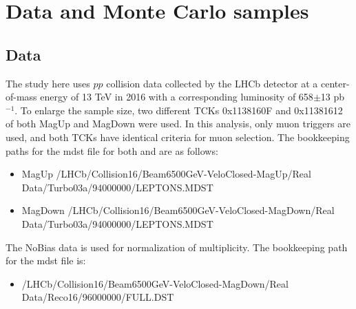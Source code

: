 \section{Data and Monte Carlo samples}
\label{Data and Monte Carlo samples}
\subsection{Data}
The study here uses $pp$ collision data collected by the LHCb detector at a center-of-mass energy of 
13 TeV in 2016 with a corresponding luminosity of 658$\pm$13 pb$^{-1}$. To enlarge the sample size, two different 
TCKs 0x1138160F and 0x11381612 of both MagUp and MagDown were used. In this analysis, only muon triggers are 
used, and both TCKs have identical criteria for muon selection. The bookkeeping paths for the mdst file for both \jpsi and \psitwos are as follows:
\begin{itemize}
    \item MagUp /LHCb/Collision16/Beam6500GeV-VeloClosed-MagUp/Real Data/Turbo03a/94000000/LEPTONS.MDST
    \item MagDown /LHCb/Collision16/Beam6500GeV-VeloClosed-MagDown/Real Data/Turbo03a/94000000/LEPTONS.MDST
\end{itemize}
The NoBias data is used for normalization of multiplicity. The bookkeeping path for the mdst file is:
\begin{itemize}
    \item /LHCb/Collision16/Beam6500GeV-VeloClosed-MagDown/Real Data/Reco16/96000000/FULL.DST
\end{itemize}


